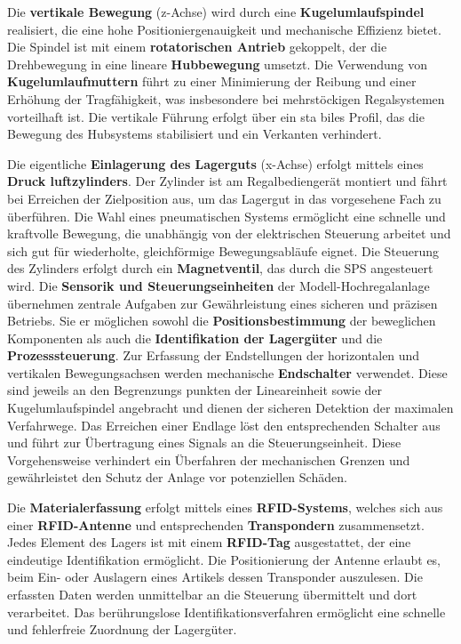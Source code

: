 Die \textbf{vertikale Bewegung} (z-Achse) wird durch eine \textbf{Kugelumlaufspindel} realisiert,
die eine hohe Positioniergenauigkeit und mechanische Effizienz bietet. Die Spindel ist
mit einem \textbf{rotatorischen Antrieb} gekoppelt, der die Drehbewegung in eine lineare
\textbf{Hubbewegung} umsetzt. Die Verwendung von \textbf{Kugelumlaufmuttern} führt zu einer
Minimierung der Reibung und einer Erhöhung der Tragfähigkeit, was insbesondere bei
mehrstöckigen Regalsystemen vorteilhaft ist. 
Die vertikale Führung erfolgt über ein sta
biles Profil, das die Bewegung des Hubsystems stabilisiert und ein Verkanten verhindert.



Die eigentliche \textbf{Einlagerung des Lagerguts} (x-Achse) erfolgt mittels eines \textbf{Druck
luftzylinders}. Der Zylinder ist am Regalbediengerät montiert und fährt bei Erreichen
der Zielposition aus, um das Lagergut in das vorgesehene Fach zu überführen. Die
Wahl eines pneumatischen Systems ermöglicht eine schnelle und kraftvolle Bewegung,
die unabhängig von der elektrischen Steuerung arbeitet und sich gut für wiederholte,
gleichförmige Bewegungsabläufe eignet. Die Steuerung des Zylinders erfolgt durch ein
\textbf{Magnetventil}, das durch die SPS angesteuert wird.
Die \textbf{Sensorik und Steuerungseinheiten} der Modell-Hochregalanlage übernehmen
zentrale Aufgaben zur Gewährleistung eines sicheren und präzisen Betriebs. Sie er
möglichen sowohl die \textbf{Positionsbestimmung} der beweglichen Komponenten als auch
die \textbf{Identifikation der Lagergüter} und die \textbf{Prozesssteuerung}.
Zur Erfassung der Endstellungen der horizontalen und vertikalen Bewegungsachsen
werden mechanische \textbf{Endschalter} verwendet. Diese sind jeweils an den Begrenzungs
punkten der Lineareinheit sowie der Kugelumlaufspindel angebracht und dienen der
sicheren Detektion der maximalen Verfahrwege. Das Erreichen einer Endlage löst
den entsprechenden Schalter aus und führt zur Übertragung eines Signals an die
Steuerungseinheit. Diese Vorgehensweise verhindert ein Überfahren der mechanischen
Grenzen und gewährleistet den Schutz der Anlage vor potenziellen Schäden.



Die \textbf{Materialerfassung} erfolgt mittels eines \textbf{RFID-Systems}, welches sich aus einer
\textbf{RFID-Antenne} und entsprechenden \textbf{Transpondern} zusammensetzt. Jedes Element
des Lagers ist mit einem \textbf{RFID-Tag} ausgestattet, der eine eindeutige Identifikation
ermöglicht. Die Positionierung der Antenne erlaubt es, beim Ein- oder Auslagern eines
Artikels dessen Transponder auszulesen. Die erfassten Daten werden unmittelbar an die
Steuerung übermittelt und dort verarbeitet. Das berührungslose Identifikationsverfahren
ermöglicht eine schnelle und fehlerfreie Zuordnung der Lagergüter.



